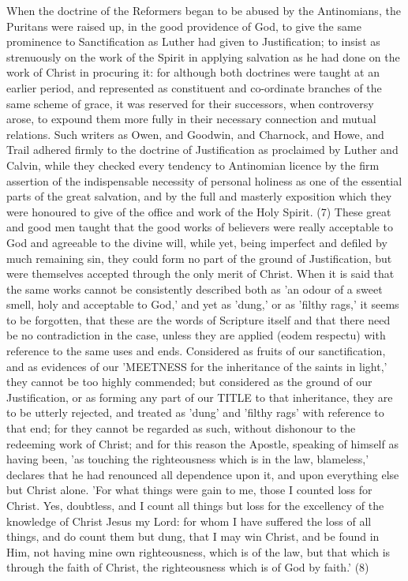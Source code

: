 \documentclass[
]{book}
\begin{document}
When the doctrine of the Reformers began to be abused by the Antinomians, the Puritans were raised up, in the good providence of God, to give the same prominence to Sanctification as Luther had given to Justification; to insist as strenuously on the work of the Spirit in applying salvation as he had done on the work of Christ in procuring it: for although both doctrines were taught at an earlier period, and represented as constituent and co-ordinate branches of the same scheme of grace, it was reserved for their successors, when controversy arose, to expound them more fully in their necessary connection and mutual relations. Such writers as Owen, and Goodwin, and Charnock, and Howe, and Trail adhered firmly to the doctrine of Justification as proclaimed by Luther and Calvin, while they checked every tendency to Antinomian licence by the firm assertion of the indispensable necessity of personal holiness as one of the essential parts of the great salvation, and by the full and masterly exposition which they were honoured to give of the office and work of the Holy Spirit. (7) These great and good men taught that the good works of believers were really acceptable to God and agreeable to the divine will, while yet, being imperfect and defiled by much remaining sin, they could form no part of the ground of Justification, but were themselves accepted through the only merit of Christ. When it is said that the same works cannot be consistently described both as 'an odour of a sweet smell, holy and acceptable to God,' and yet as 'dung,' or as 'filthy rags,' it seems to be forgotten, that these are the words of Scripture itself and that there need be no contradiction in the case, unless they are applied (eodem respectu) with reference to the same uses and ends. Considered as fruits of our sanctification, and as evidences of our 'MEETNESS for the inheritance of the saints in light,' they cannot be too highly commended; but considered as the ground of our Justification, or as forming any part of our TITLE to that inheritance, they are to be utterly rejected, and treated as 'dung' and 'filthy rags' with reference to that end; for they cannot be regarded as such, without dishonour to the redeeming work of Christ; and for this reason the Apostle, speaking of himself as having been, 'as touching the righteousness which is in the law, blameless,' declares that he had renounced all dependence upon it, and upon everything else but Christ alone. 'For what things were gain to me, those I counted loss for Christ. Yes, doubtless, and I count all things but loss for the excellency of the knowledge of Christ Jesus my Lord: for whom I have suffered the loss of all things, and do count them but dung, that I may win Christ, and be found in Him, not having mine own righteousness, which is of the law, but that which is through the faith of Christ, the righteousness which is of God by faith.' (8)
\end{document}
